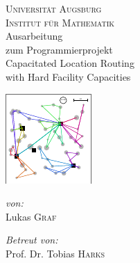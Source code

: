 \documentclass[a4paper,ngerman,12pt,bibtotoc]{scrartcl}
\theoremstyle{definition}
\theoremstyle{plain}
\theoremstyle{remark}
\begin{document}
\author{Lukas Graf}
\date{Letzte Aktualisierung: \today}

\thispagestyle{empty}


\begin{titlepage}\center
	\textsc{\LARGE Universität Augsburg}\\[1cm]
	
	\textsc{\Large Institut für Mathematik}\\[1.5cm]
	
	{\Large Ausarbeitung \\[1cm]}
	zum Programmierprojekt\\[1cm]
	{\huge Capacitated Location Routing \\ with Hard Facility Capacities}

	\begin{center}
		\includegraphics[width=.6\textwidth]{bilder/title.pdf}
	\end{center}		
	
	\vfill
	
	\begin{minipage}{0.4\textwidth}
		\begin{flushleft} \large
			\emph{von:}\\
			Lukas \textsc{Graf}
		\end{flushleft}
	\end{minipage}
	\begin{minipage}{0.4\textwidth}
		\begin{flushright} \large
			\emph{Betreut von:} \\
			Prof. Dr. Tobias \textsc{Harks}
		\end{flushright}
	\end{minipage}
	
\end{titlepage}
\end{document}
